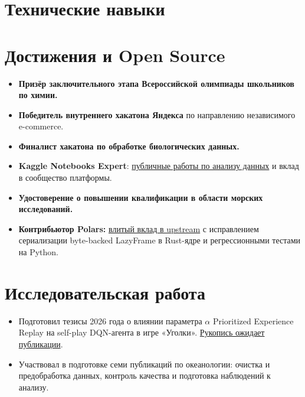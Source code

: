\documentclass[10pt,a4paper]{article}
\begin{document}
\section{Технические навыки}

{\cvsmall
{}
}

\section{Достижения и Open Source}

\begin{itemize}
  \item \textbf{Призёр заключительного этапа Всероссийской олимпиады школьников по химии.}
  \item \textbf{Победитель внутреннего хакатона Яндекса} по направлению независимого e-commerce.
  \item \textbf{Финалист хакатона по обработке биологических данных.}
  \item \textbf{Kaggle Notebooks Expert}: \href{https://www.kaggle.com/samoilovmikhail}{публичные работы по анализу данных} и вклад в сообщество платформы.
  \item \textbf{Удостоверение о повышении квалификации в области морских исследований.}
  \item \textbf{Контрибьютор Polars:} \href{https://github.com/pola-rs/polars/pull/28568}{влитый вклад в upstream} с исправлением сериализации byte-backed LazyFrame в Rust-ядре и регрессионными тестами на Python.
\end{itemize}

\section{Исследовательская работа}

\begin{itemize}
  \item Подготовил тезисы 2026 года о влиянии параметра $\alpha$ Prioritized Experience Replay на self-play DQN-агента в игре «Уголки». \href{https://github.com/Samoilov2004/UgolkiEngine/blob/main/report/%D0%A1%D0%B0%D0%BC%D0%BE%D0%B9%D0%BB%D0%BE%D0%B2_%D1%82%D0%B5%D0%B7%D0%B8%D1%81%D1%8B.pdf}{Рукопись ожидает публикации}.
  \item Участвовал в подготовке семи публикаций по океанологии: очистка и предобработка данных, контроль качества и подготовка наблюдений к анализу.
\end{itemize}
\end{document}
